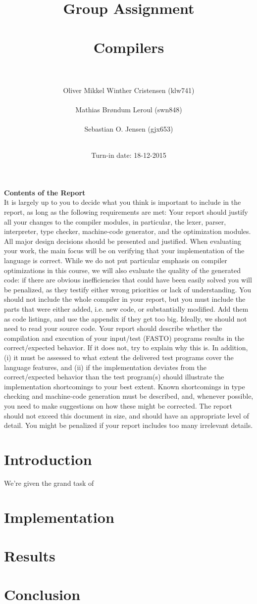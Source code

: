 \documentclass[]{article}
\title{Group Assignment\\ \ \\Compilers\\ \ \\}
\author{Oliver Mikkel Winther Cristensen (klw741) \\ \ \\Mathias Brøndum Leroul (swn848)\\ \ \\Sebastian O. Jensen (gjx653)\\ \ \\}
\date{Turn-in date: 18-12-2015}
\begin{document}
\maketitle
\newpage

\textbf{Contents of the Report}\\
It is largely up to you to decide what you think is important to include in the report, as long as
the following requirements are met:
Your report should justify all your changes to the compiler modules, in particular, the lexer,
parser, interpreter, type checker, machine-code generator, and the optimization modules. All
major design decisions should be presented and justified.
When evaluating your work, the main focus will be on verifying that your implementation
of the language is correct. While we do not put particular emphasis on compiler optimizations
in this course, we will also evaluate the quality of the generated code: if there are obvious
inefficiencies that could have been easily solved you will be penalized, as they testify either
wrong priorities or lack of understanding.
You should not include the whole compiler in your report, but you must include the parts
that were either added, i.e. new code, or substantially modified. Add them as code listings, and
use the appendix if they get too big. Ideally, we should not need to read your source code.
Your report should describe whether the compilation and execution of your input/test (FASTO)
programs results in the correct/expected behavior. If it does not, try to explain why this is. In
addition, (i) it must be assessed to what extent the delivered test programs cover the language
features, and (ii) if the implementation deviates from the correct/expected behavior than the test
program(s) should illustrate the implementation shortcomings to your best extent.
Known shortcomings in type checking and machine-code generation must be described, and,
whenever possible, you need to make suggestions on how these might be corrected.
The report should not exceed this document in size, and should have an appropriate level of
detail. You might be penalized if your report includes too many irrelevant details.

\section{Introduction}
	We're given the grand task of 
\section{Implementation}
\section{Results}
\section{Conclusion}
\end{document}

